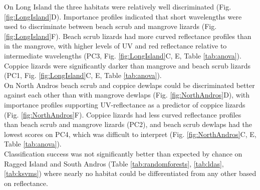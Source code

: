 On Long Island the three habitats were relatively well discriminated (Fig. \ref{fig:LongIsland}D). Importance profiles indicated that short wavelengths were used to discriminate between beach scrub and mangrove lizards (Fig. \ref{fig:LongIsland}F). Beach scrub lizards had more curved reflectance profiles than in the mangrove, with higher levels of UV and red reflectance relative to intermediate wavelengths (PC3, Fig. \ref{fig:LongIsland}C, E, Table \ref{tab:anova}). Coppice lizards were significantly darker than mangrove and beach scrub lizards (PC1, Fig. \ref{fig:LongIsland}C, E, Table \ref{tab:anova}).\\ 

On North Andros beach scrub and coppice dewlaps could be discriminated better against each other than with mangrove dewlaps (Fig. \ref{fig:NorthAndros}D), with importance profiles supporting UV-reflectance as a predictor of coppice lizards (Fig. \ref{fig:NorthAndros}F). Coppice lizards had less curved reflectance profiles than beach scrub and mangrove lizards (PC2), and beach scrub dewlaps had the lowest scores on PC4, which was difficult to interpret (Fig. \ref{fig:NorthAndros}C, E, Table \ref{tab:anova}).\\

Classification success was not significantly better than expected by chance on Ragged Island and South Andros (Table \ref{tab:randomforests}, \ref{tab:ldas}, \ref{tab:ksvms}) where nearly no habitat could be differentiated from any other based on reflectance.